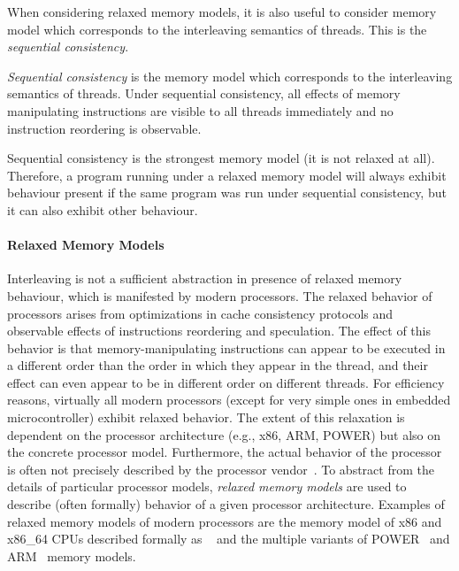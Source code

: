When considering relaxed memory models, it is also useful to consider memory
model which corresponds to the interleaving semantics of threads.
This is the \emph{sequential consistency}.

\begin{definition}
    \emph{Sequential consistency} is the memory model which corresponds to the
    interleaving semantics of threads.
    Under sequential consistency, all effects of memory manipulating
    instructions are visible to all threads immediately and no instruction
    reordering is observable.
\end{definition}

Sequential consistency is the strongest memory model (it is not relaxed at all).
Therefore, a program running under a relaxed memory model will always exhibit
behaviour present if the same program was run under sequential consistency, but
it can also exhibit other behaviour.

\paragraph{Relaxed Memory Models}

Interleaving is not a sufficient abstraction in presence of relaxed memory
behaviour, which is manifested by modern processors.
The relaxed behavior of processors arises from optimizations in cache
consistency protocols and observable effects of instructions reordering and
speculation.
The effect of this behavior is that memory-manipulating instructions can appear
to be executed in a different order than the order in which they appear in the
thread, and their effect can even appear to be in different order on different
threads.
For efficiency reasons, virtually all modern processors (except for very simple
ones in embedded microcontroller) exhibit relaxed behavior.
The extent of this relaxation is dependent on the processor architecture (e.g.,
x86, ARM, POWER) but also on the concrete processor model.
Furthermore, the actual behavior of the processor is often not precisely
described by the processor vendor~\cite{x86tso}.
To abstract from the details of particular processor models, \emph{relaxed
memory models} are used to describe (often formally) behavior of a given
processor architecture.
Examples of relaxed memory models of modern processors are the memory model of
x86 and x86\_64 CPUs described formally as \xtso~\cite{x86tso} and the multiple
variants of POWER~\cite{Sarkar2011,Mador-Haim2012} and
ARM~\cite{Flur2016,Alglave2014,Pulte2017} memory models.


